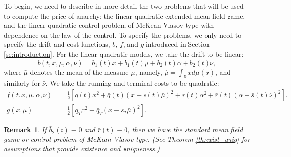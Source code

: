 \documentclass[11pt]{article}
\newtheorem{remark}{Remark}
\begin{document}
To begin, we need to describe in more detail the two problems that will be used to compute the price of anarchy: the linear quadratic extended mean field game, and the linear quadratic control problem of McKean-Vlasov type with dependence on the law of the control. To specify the problems, we only need to specify the drift and cost functions, $b$, $f$, and $g$ introduced in Section \ref{se:introduction}. For the linear quadratic models, we take the drift to be linear:
\begin{equation*}
    b(t,x,\mu,\alpha,\nu)=b_1(t)x+\bar{b}_1(t) \bar{\mu}+b_2(t) \alpha+\bar{b}_2(t) \bar{\nu},
\end{equation*}
where $\bar{\mu}$ denotes the mean of the measure $\mu$, namely, $\bar{\mu}=\int_{\mathbb{R}}xd\mu(x)$, and similarly for $\bar{\nu}$. We take the running and terminal costs to be quadratic:
\begin{equation*}
\begin{split}
    f(t,x,\mu,\alpha,\nu)&=\frac{1}{2}\left[q(t)x^2+\bar{q}(t)(x-s(t)\bar{\mu})^2 +r(t)\alpha^2+\bar{r}(t)(\alpha-\bar{s}(t)\bar{\nu})^2\right], \\
    g(x,\mu)&=\frac{1}{2}\left[q_T x^2+\bar{q}_T (x-s_T \bar{\mu})^2\right].
\end{split}
\end{equation*}
\begin{remark}
If $\bar{b}_2(t)\equiv0$ and $\bar{r}(t)\equiv0$, then we have the standard mean field game or control problem of McKean-Vlasov type. (See Theorem \ref{th:exist_uniq} for assumptions that provide existence and uniqueness.)
\end{remark}
\end{document}
